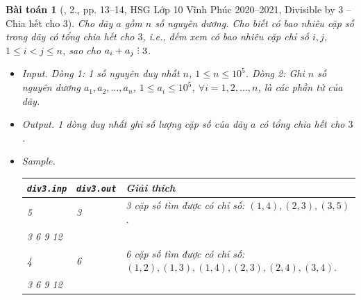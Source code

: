 \documentclass{article}
\newtheorem{baitoan}{Bài toán}
\DeclareRobustCommand{\divby}{%
	\mathrel{\vbox{\baselineskip.65ex\lineskiplimit0pt\hbox{.}\hbox{.}\hbox{.}}}%
}
\begin{document}
\begin{baitoan}[\cite{Trung_HSG_THPT_Tin}, 2., pp. 13--14, HSG Lớp 10 Vĩnh Phúc 2020--2021, Divisible by 3 -- Chia hết cho 3]
	Cho dãy $a$ gồm $n$ số nguyên dương. Cho biết có bao nhiêu cặp số trong dãy có tổng chia hết cho $3$, i.e., đếm xem có bao nhiêu cặp chỉ số $i,j$, $1\le i < j\le n$, sao cho $a_i + a_j\divby3$.
	\begin{itemize}
		\item {\sf Input.} Dòng 1: 1 số nguyên duy nhất $n$, $1\le n\le10^5$. Dòng 2: Ghi $n$ số nguyên dương $a_1,a_2,\ldots,a_n$, $1\le a_i\le10^5$, $\forall i = 1,2,\ldots,n$, là các phần tử của dãy.
		\item {\sf Output.} 1 dòng duy nhất ghi số lượng cặp số của dãy $a$ có tổng chia hết cho $3$.
		\item {\sf Sample.}
		\begin{table}[H]
			\centering
			\begin{tabular}{|l|l|l|}
				\hline
				{\tt div3.inp} & {\tt div3.out} & Giải thích \\
				\hline
				5 & 3 & 3 cặp số tìm được có chỉ số: $(1,4),(2,3),(3,5)$. \\
				3 6 9 12 & & \\
				\hline
				4 & 6 & 6 cặp số tìm được có chỉ số: $(1,2),(1,3),(1,4),(2,3),(2,4),(3,4)$. \\
				3 6 9 12 & & \\
				\hline
			\end{tabular}
		\end{table}
	\end{itemize}
\end{baitoan}
\end{document}
